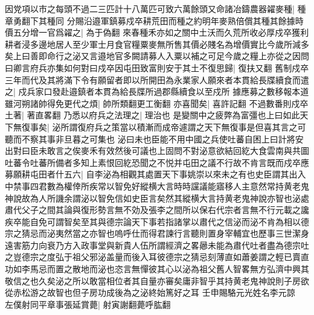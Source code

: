 因党項以市之每頭不過二三匹計十八萬匹可致六萬餘頭又命諸冶鑄農器糴麥種|{
	種章勇翻下其種同}
分賜沿邉軍鎮募戍卒耕荒田而種之約明年麥熟倍償其種其餘據時價五分增一官爲糴之|{
	為于偽翻}
來春種禾亦如之關中土沃而久荒所收必厚戍卒獲利耕者浸多邊地居人至少軍士月食官糧粟麥無所售其價必賤名為增價實比今歲所減多矣上曰善即命行之泌又言邉地官多闕請募人入粟以補之可足今歲之糧上亦從之因問曰卿言府兵亦集如何對曰戍卒因屯田致富則安于其土不復思歸|{
	復扶又翻}
舊制戍卒三年而代及其將滿下令有願留者即以所開田為永業家人願來者本貫給長牒續食而遣之|{
	戍兵家口發赴邉鎮者本貫為給長牒所過郡縣續食以至戍所}
據應募之數移報本道雖河朔諸帥得免更代之煩|{
	帥所類翻更工衡翻}
亦喜聞矣|{
	喜許記翻}
不過數番則戍卒土著|{
	著直畧翻}
乃悉以府兵之法理之|{
	理治也}
是變關中之疲弊為富彊也上曰如此天下無復事矣|{
	泌所謂復府兵之策當以積漸而成帝遽謂之天下無復事是但喜其言之可聽而不察其事非旦暮之可集也}
泌曰未也臣能不用中國之兵使吐蕃自困上曰計將安出對曰臣未敢言之俟麥禾有效然後可議也上固問不對泌意欲結回紇大食雲南與共圖吐蕃令吐蕃所備者多知上素恨回紇恐聞之不悦并屯田之議不行故不肯言既而戍卒應募願耕屯田者什五六|{
	自李泌為相觀其處置天下事姚崇以來未之有也史臣謂其出入中禁事四君數為權倖所疾常以智免好縱横大言時時讜議能寤移人主意然常持黄老鬼神說故為人所譏余謂泌以智免信如史臣言矣然其縱横大言持黄老鬼神說亦智也泌處肅代父子之間其論與復形勢言無不効及張李之間所以保右代宗者言無不行元載之讒疾卒能自免可謂智矣至其與德宗論天下事若指諸掌以肅代之信泌而泌不肯為相以德宗之猜忌而泌夷然當之亦智也嗚呼仕而得君諫行言聽則置身宰輔宜也歷事三世潔身遠害筋力向衰乃方入政事堂與新貴人伍所謂經濟之畧曏未能為肅代吐者盡為德宗吐之豈德宗之度弘于祖父邪泌盖量而後入耳彼德宗之猜忌刻薄直如蕭姜謂之輕已賣直功如李馬忌而置之散地而泌也恣言無憚彼其心以泌為祖父舊人智畧無方弘濟中興其敬信之也久矣泌之所以敢當相位者其自量亦審矣庸非智乎其持黄老鬼神說則子房欲從赤松游之故智也但子房功成後為之泌終始篤好之耳}
壬申賜駱元光姓名李元諒　左僕射同平章事張延賞薨|{
	射寅謝翻薨呼肱翻}


